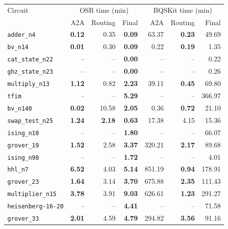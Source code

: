
\begin{table}[p]
\centering
\scriptsize
\begin{tabular}{l|rrr|rrr}
\hline
Circuit & \multicolumn{3}{c|}{OSR time (min)} & \multicolumn{3}{c}{BQSKit time (min)} \\
 & A2A & Routing & Final & A2A & Routing & Final \\
\hline
\texttt{adder\_n4} & \textbf{0.12} & 0.35 & \textbf{0.09} & 63.37 & \textbf{0.23} & 49.69 \\
\texttt{bv\_n14} & \textbf{0.01} & 0.30 & \textbf{0.09} & 0.22 & \textbf{0.19} & 1.35 \\
\texttt{cat\_state\_n22} & -- & -- & \textbf{0.00} & -- & -- & 0.22 \\
\texttt{ghz\_state\_n23} & -- & -- & \textbf{0.00} & -- & -- & 0.26 \\
\texttt{multiply\_n13} & \textbf{1.12} & 0.82 & \textbf{2.23} & 39.11 & \textbf{0.45} & 69.80 \\
\texttt{tfim} & -- & -- & \textbf{5.29} & -- & -- & 366.97 \\
\texttt{bv\_n140} & \textbf{0.02} & 10.58 & \textbf{2.05} & 0.36 & \textbf{0.72} & 21.10 \\
\texttt{swap\_test\_n25} & \textbf{1.24} & \textbf{2.18} & \textbf{0.63} & 17.38 & 4.15 & 15.36 \\
\texttt{ising\_n10} & -- & -- & \textbf{1.80} & -- & -- & 66.07 \\
\texttt{grover\_19} & \textbf{1.52} & 2.58 & \textbf{3.37} & 320.21 & \textbf{2.17} & 89.68 \\
\texttt{ising\_n98} & -- & -- & \textbf{1.72} & -- & -- & 4.01 \\
\texttt{hhl\_n7} & \textbf{6.52} & 4.03 & \textbf{5.14} & 851.19 & \textbf{0.94} & 178.91 \\
\texttt{grover\_23} & \textbf{1.64} & 3.14 & \textbf{3.70} & 675.88 & \textbf{2.35} & 111.43 \\
\texttt{multiplier\_n15} & \textbf{3.78} & 3.91 & \textbf{9.03} & 626.61 & \textbf{1.23} & 291.27 \\
\texttt{heisenberg-16-20} & -- & -- & \textbf{4.41} & -- & -- & 71.58 \\
\texttt{grover\_33} & \textbf{2.01} & 4.59 & \textbf{4.79} & 294.82 & \textbf{3.56} & 91.16 \\

\end{tabular}
\end{table}
